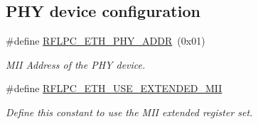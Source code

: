 \subsection*{P\-H\-Y device configuration}
\begin{DoxyCompactItemize}
\item 
\#define \hyperlink{group__config_ga4855717644cc229c169a9aad41e807c1}{R\-F\-L\-P\-C\-\_\-\-E\-T\-H\-\_\-\-P\-H\-Y\-\_\-\-A\-D\-D\-R}~(0x01)
\begin{DoxyCompactList}\small\item\em M\-I\-I Address of the P\-H\-Y device. \end{DoxyCompactList}\item 
\#define \hyperlink{group__config_ga02c4bc43d0f8f9c635f405bc9bd0b801}{R\-F\-L\-P\-C\-\_\-\-E\-T\-H\-\_\-\-U\-S\-E\-\_\-\-E\-X\-T\-E\-N\-D\-E\-D\-\_\-\-M\-I\-I}
\begin{DoxyCompactList}\small\item\em Define this constant to use the M\-I\-I extended register set. \end{DoxyCompactList}\end{DoxyCompactItemize}

